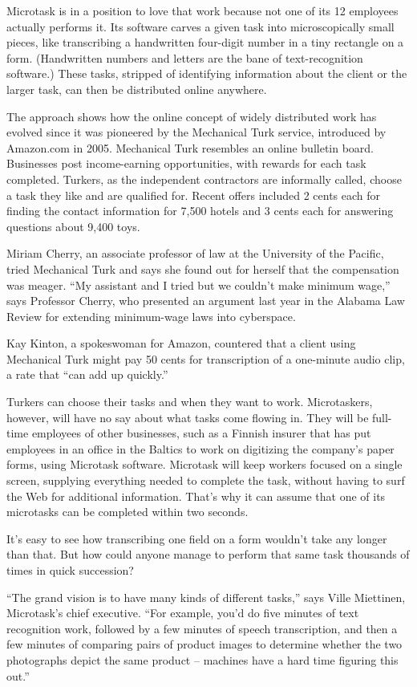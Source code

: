 ﻿\documentclass[12pt]{article}
\begin{document}
Microtask is in a position to love that work because not one of its 12 employees actually performs
it. Its software carves a given task into microscopically small pieces, like transcribing a
handwritten four-digit number in a tiny rectangle on a form. (Handwritten numbers and letters are
the bane of text-recognition software.) These tasks, stripped of identifying information about the
client or the larger task, can then be distributed online anywhere.

The approach shows how the online concept of widely distributed work has evolved since it was
pioneered by the Mechanical Turk service, introduced by Amazon.com in 2005. Mechanical Turk
resembles an online bulletin board. Businesses post income-earning opportunities, with rewards for
each task completed. Turkers, as the independent contractors are informally called, choose a task
they like and are qualified for. Recent offers included 2 cents each for finding the contact
information for 7,500 hotels and 3 cents each for answering questions about 9,400 toys.

Miriam Cherry, an associate professor of law at the University of the Pacific, tried Mechanical Turk
and says she found out for herself that the compensation was meager. ``My assistant and I tried but
we couldn't make minimum wage,'' says Professor Cherry, who presented an argument last year in the
Alabama Law Review for extending minimum-wage laws into cyberspace.

Kay Kinton, a spokeswoman for Amazon, countered that a client using Mechanical Turk might pay 50
cents for transcription of a one-minute audio clip, a rate that ``can add up quickly.''

Turkers can choose their tasks and when they want to work. Microtaskers, however, will have no say
about what tasks come flowing in. They will be full-time employees of other businesses, such as a
Finnish insurer that has put employees in an office in the Baltics to work on digitizing the
company's paper forms, using Microtask software. Microtask will keep workers focused on a single
screen, supplying everything needed to complete the task, without having to surf the Web for
additional information. That's why it can assume that one of its microtasks can be completed within
two seconds.

It's easy to see how transcribing one field on a form wouldn't take any longer than that. But how
could anyone manage to perform that same task thousands of times in quick succession?

``The grand vision is to have many kinds of different tasks,'' says Ville Miettinen, Microtask's
chief executive. ``For example, you'd do five minutes of text recognition work, followed by a few
minutes of speech transcription, and then a few minutes of comparing pairs of product images to
determine whether the two photographs depict the same product -- machines have a hard time figuring
this out.''
\end{document}
